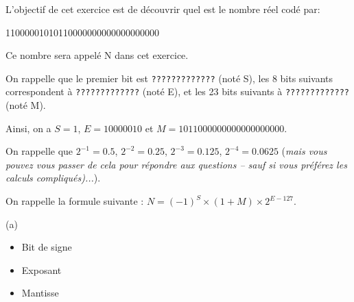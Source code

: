 \documentclass[11pt,a4paper]{exam}
\begin{document}
\begin{questions}
\begin{spacing}{1}
			L'objectif de cet exercice est de découvrir quel est le nombre réel codé par:
			
			11000001010110000000000000000000
		
			Ce nombre sera appelé N dans cet exercice.
		
			On rappelle que le premier bit est  \texttt{?????????????} (noté S), les 8 bits suivants correspondent à \texttt{?????????????} (noté E), et les 23 bits suivants à \texttt{?????????????} (noté M).
		
		Ainsi, on a $S = 1$, $E = 10000010$ et $M = 1011000000000000000000$.
		
		On rappelle que $2^{-1} = 0.5$, $2^{-2} = 0.25$, $2^{-3} = 0.125$, $2^{-4} = 0.0625$ (\textit{mais vous pouvez vous passer de cela pour répondre aux questions -- sauf si vous préférez les calculs compliqués)...}).
		
		On rappelle la formule suivante : $N = (-1)^S \times (1 + M) \times 2^{E - 127}$.
		
		\begin{solution}
			
			(a) \begin{itemize}
				\item Bit de signe
				\item Exposant
				\item Mantisse
			\end{itemize}
			

\end{solution}
\end{spacing}
\end{questions}
\end{document}

